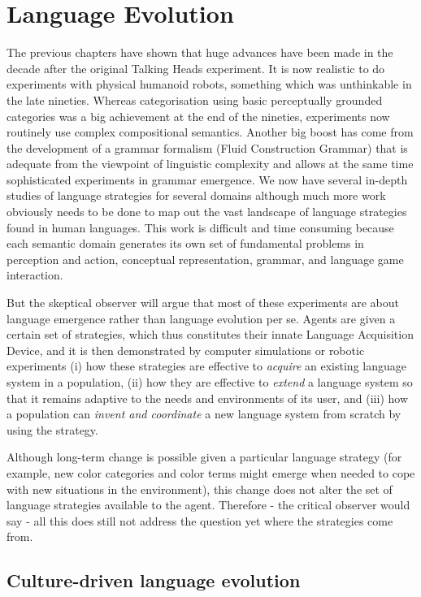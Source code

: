 \chapter{Language Evolution}
\label{c:evolution}

The previous chapters have shown that huge advances have been made in the decade after the original Talking Heads experiment. 
It is now realistic to do experiments with physical humanoid robots, something which was unthinkable 
in the late nineties. Whereas categorisation using 
basic perceptually grounded categories was a big achievement at the end of the nineties, experiments now routinely use 
complex compositional semantics. Another big boost has come from the development of a grammar formalism
(Fluid Construction Grammar) that is adequate from the viewpoint of linguistic complexity and allows at the same time
sophisticated experiments in grammar emergence. We now have several in-depth studies of language strategies for several 
domains although much more work obviously needs to be done to map out the vast landscape of language strategies found in 
human languages. This work is difficult and time consuming because each semantic domain generates its own set of fundamental 
problems in perception and action, conceptual representation, grammar, and language game interaction. 

But the skeptical observer will argue that most of these experiments are about language emergence rather than 
language evolution per se. Agents are given a certain set of strategies, which thus constitutes their 
innate Language Acquisition Device, and it is then demonstrated by computer simulations or 
robotic experiments (i) how these strategies are effective to {\itshape acquire} an existing language system in a 
population, (ii) how they are effective to {\itshape extend} a language system so that it remains adaptive 
to the needs and environments of its user, and (iii) how a population can {\itshape invent and coordinate} a new language system from 
scratch by using the strategy. 

Although long-term change is possible
given a particular language strategy (for example, new color categories and color terms might emerge
when needed to cope with new situations in the environment), this change does not alter
the set of language strategies available to the agent. Therefore - the critical observer would say - all this does still
not address the question yet where the strategies come from. 

\section{Culture-driven language evolution}

